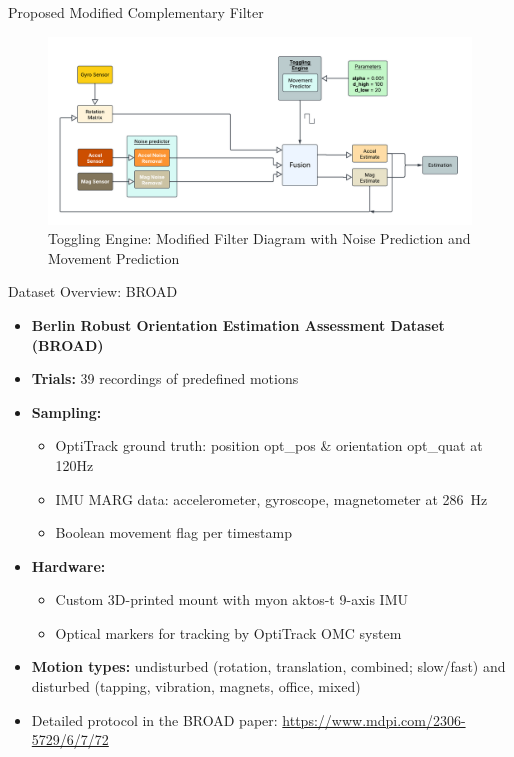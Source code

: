 \documentclass[aspectratio=169,xcolor=dvipsnames]{beamer}
\begin{document}
\begin{frame}{Proposed Modified Complementary Filter}
\begin{figure}
    \centering
    \includegraphics[width=1\linewidth]{logos/workflownew.png}
    \caption{Toggling Engine: Modified Filter Diagram with Noise Prediction and Movement Prediction}
    \label{fig:twinboost}
\end{figure}
\end{frame}



\begin{frame}{Dataset Overview: BROAD}
\begin{itemize}
  \item \textbf{Berlin Robust Orientation Estimation Assessment Dataset (BROAD)} \cite{BROAD}
  \item \textbf{Trials:} 39 recordings of predefined motions
  \item \textbf{Sampling:}
    \begin{itemize}
      \item OptiTrack ground truth: position {opt\_pos} \& orientation {opt\_quat} at 120Hz
      \item IMU MARG data: accelerometer, gyroscope, magnetometer at \SI{286}{Hz}
      \item Boolean movement flag per timestamp
    \end{itemize}
  \item \textbf{Hardware:}
    \begin{itemize}
      \item Custom 3D-printed mount with myon aktos-t 9-axis IMU
      \item Optical markers for tracking by OptiTrack OMC system
    \end{itemize}
  \item \textbf{Motion types:} undisturbed (rotation, translation, combined; slow/fast) and disturbed (tapping, vibration, magnets, office, mixed)
  \item Detailed protocol in the BROAD paper: \url{https://www.mdpi.com/2306-5729/6/7/72}
\end{itemize}
\end{frame}
\end{document}
